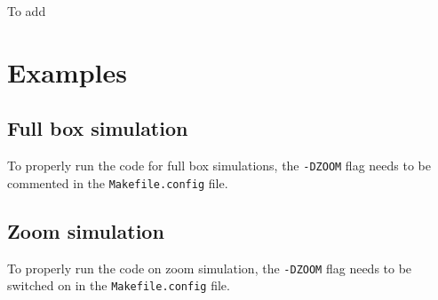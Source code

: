 \documentclass{article}
\begin{document}
To add 

\section{Examples}

\subsection{Full box simulation}
To properly run the code for full box simulations, the \texttt{-DZOOM} flag needs to be commented in the \texttt{Makefile.config} file.

\subsection{Zoom simulation}
To properly run the code on zoom simulation, the \texttt{-DZOOM} flag needs to be switched on in the \texttt{Makefile.config} file.
\end{document}
